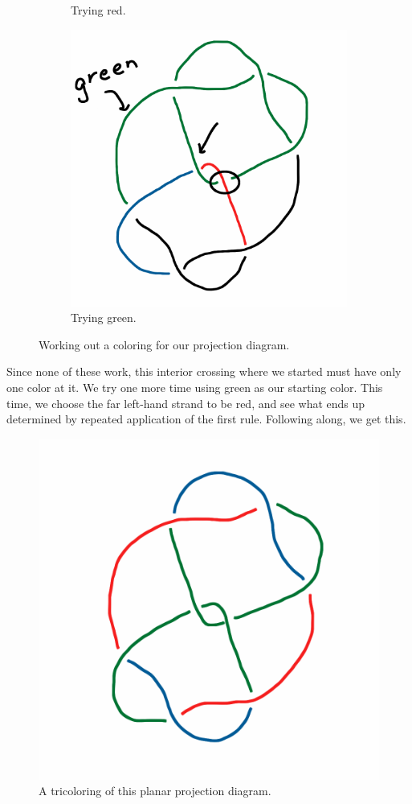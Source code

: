 \documentclass[12pt,letterpaper]{article}
\theoremstyle{definition}
\begin{document}
\begin{figure}
\begin{subfigure}{.3\textwidth}
        \caption{Trying red.}
    \end{subfigure}
    \quad
    \begin{subfigure}{.3\textwidth}
        \centering
        \includegraphics[width=\textwidth]{knotpics/colorable4.png}
        \caption{Trying green.}
    \end{subfigure}
    \caption{Working out a coloring for our projection diagram.}
\end{figure}

Since none of these work, this interior crossing where we started must have only one color at it.
We try one more time using green as our starting color.
This time, we choose the far left-hand strand to be red, and see what ends up determined by repeated application of the first rule. 
Following along, we get this.
\begin{figure}[h]
    \centering
    \includegraphics[width=.5\textwidth]{knotpics/colorable5.png}
    \caption{A tricoloring of this planar projection diagram.}
\end{figure}
\end{document}
